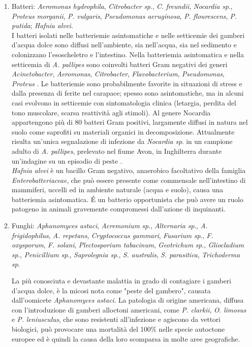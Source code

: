 \documentclass[11pt,a4paper,italian,twoside,openany]{memoir}
\begin{document}
\begin{enumerate}[label={\alph*)}]
  \item Batteri: \emph{Aeromonas hydrophila}, \emph{Citrobacter sp}., \emph{C. freundii}, \emph{Nocardia sp}., \emph{Proteus morganii}, \emph{P. vulgaris}, \emph{Pseudomonas aeruginosa}, \emph{P. flourescens}, \emph{P. putida}; \emph{Hafnia alvei}.\\
  I batteri isolati nelle batteriemie asintomatiche e nelle setticemie dei gamberi d'acqua dolce sono diffusi nell'ambiente, sia nell'acqua, sia nel sedimento e colonizzano l'esoscheletro e l'intestino. Nella batteriemia asintomatica e nella setticemia di \emph{A. pallipes} sono coinvolti batteri Gram negativi dei generi \emph{Acinetobacter}, \emph{Aeromonas}, \emph{Citrobacter}, \emph{Flavobacterium}, \emph{Pseudomonas}, \emph{Proteus} \cite{Quaglio 2011}. Le batteriemie sono probabilmente favorite in situazioni di stress e dalla presenza di ferite nel carapace; spesso sono asintomatiche, ma in alcuni casi evolvono in setticemie con sintomatologia clinica (letargia, perdita del tono muscolare, scarsa reattività agli stimoli). Al genere Nocardia appartengono più di 80 batteri Gram positivi, largamente diffusi in natura nel suolo come saprofiti su materiali organici in decomposizione. Attualmente risulta un'unica segnalazione di infezione da \emph{Nocardia sp}. in un campione adulto di \emph{A. pallipes}, prelevato nel fiume Avon, in Inghilterra durante un'indagine su un episodio di peste \cite{Alderman 1986}. \\
  \emph{Hafnia alvei} è un bacillo Gram negativo, anaerobico facoltativo della famiglia \emph{Enterobatteriaceae}, che può essere presente come commensale nell'intestino di mammiferi, uccelli ed in ambiente naturale (acqua e suolo), causa una batteriemia asintomatica. É un batterio opportunista che può avere un ruolo patogeno in animali gravemente compromessi dall'azione di inquinanti.
  \item Funghi: \emph{Aphanomyces astaci}, \emph{Acremonium sp}., \emph{Alternaria sp}., \emph{A. frigidophilus}, \emph{A. repetans}, \emph{Cryptococcus gammari}, \emph{Fusarium sp}., \emph{F. oxysporum}, \emph{F. solani}, \emph{Plectosporium tabacinum}, \emph{Geotrichum sp}., \emph{Gliocladium sp}., \emph{Penicillium sp}., \emph{Saprolegnia sp}., \emph{S. australis}, \emph{S. parasitica}, \emph{Trichoderma sp}. 

  La più conosciuta e devastante malattia in grado di contagiare i gamberi d'acqua dolce, è la micosi nota come "peste del gambero", causata dall'oomicete \emph{Aphanomyces astaci}. La patologia di origine americana, diffusa con l'introduzione di gamberi alloctoni americani, come \emph{P. clarkii}, \emph{O. limosus} e \emph{P. leniusculus}, che sono resistenti all'infezione e agiscono da vettori biologici, può provocare una mortalità del 100\% nelle specie autoctone europee ed è quindi la causa della loro scomparsa in molte aree geografiche. 


\end{enumerate}
\end{document}
